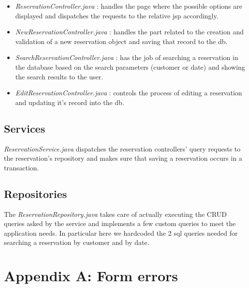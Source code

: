 \documentclass{article}
\begin{document}
\begin{itemize}
	\item \textit{ReservationController.java} : handles the page where the possible
	options are displayed and dispatches the requests to the relative jsp accordingly.
	
	\item \textit{NewReservationController.java} : handles the part related to the 
		creation and validation of a new reservation object and saving that
		 record to the db.
		
	\item \textit{SearchReservationController.java} : has the job of searching a
	reservation in the database based on the search parameters (customer or date) and
	showing the search results to the user.
	
	\item \textit{EditReservationController.java} : controls the process of editing 
	a reservation and updating it's record into the db.

\end{itemize}



\subsection*{Services}
\textit{ReservationService.java} dispatches the reservation controllers' query requests to the reservation's repository 
and makes sure that saving a reservation occurs in a transaction.


\subsection*{Repositories}
The \textit{ReservationRepository.java} takes care of actually executing the CRUD queries
asked by the service and implements a few custom queries to meet the application needs.
In particular here we hardcoded the 2 sql queries needed for searching a reservation
by customer and by date.








\newpage
\section*{Appendix A: Form errors}

\vspace*{5mm}
\end{document}
